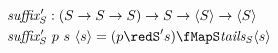 \documentclass[preview]{standalone}
\begin{document}
\begin{align*}%
    \mathit{suffix'_S} &: (S \rightarrow S \rightarrow S) \rightarrow S \rightarrow \vect{S} \rightarrow \vect{S}\\
    \mathit{suffix'_S} &\ p\ s\ \vect{s} = (p \redS' s) \fMapS \mathit{tails_S} \vect{s}%
\end{align*}
\end{document}
